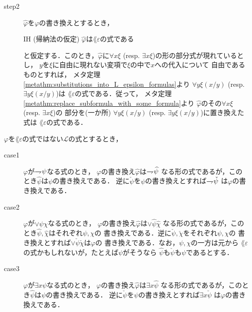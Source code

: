 \begin{metaprf}
\begin{description}
			\item[step2] $\widehat{\varphi}$を$\varphi$の書き換えとするとき，
				\begin{itembox}[l]{IH (帰納法の仮定)}
					$\widehat{\varphi}$は$\lang{\varepsilon}$の式である
				\end{itembox}
				と仮定する．このとき，$\widehat{\varphi}$に$\forall x \xi$ 
				(resp. $\exists x \xi$)の形の部分式が現れているとし，
				$y$を$\xi$に自由に現れない変項で$\xi$の中で$x$への代入について
				自由であるものとすれば，
				メタ定理\ref{metathm:substitutions_into_L_epsilon_formulas}より
				$\forall y \xi(x/y)$ (resp. $\exists y \xi(x/y)$)は
				$\lang{\varepsilon}$の式である．従って，
				メタ定理\ref{metathm:replace_subformula_with_some_formula}より
				$\widehat{\varphi}$のその$\forall x \xi$ (resp. $\exists x \xi$)の
				部分を(一か所)
				$\forall y \xi(x/y)$ (resp. $\exists y \xi(x/y)$)に置き換えた式は
				$\lang{\varepsilon}$の式である．
				\QED
		\end{description}
	\end{metaprf}
	
	\begin{screen}
		\begin{metathm}[部分式の書き換えとの関係]
		\label{metathm:relation_to_subformula_rewriting}
			$\varphi$を$\lang{\varepsilon}$の式ではない$\mathcal{L}$の式とするとき，
			\begin{description}
				\item[case1] $\varphi$が$\rightharpoondown\hspace{-0.25em} \psi$なる式のとき，
					$\varphi$の書き換え$\widehat{\varphi}$は$\rightharpoondown\hspace{-0.25em} \widehat{\psi}$
					なる形の式であるが，このとき$\widehat{\psi}$は$\psi$の書き換えである．
					逆に$\check{\psi}$を$\psi$の書き換えとすれば$\rightharpoondown\hspace{-0.25em} \check{\psi}$
					は$\varphi$の書き換えである．
					
				\item[case2] $\varphi$が$\vee \psi \chi$なる式のとき，
					$\varphi$の書き換え$\widehat{\varphi}$は$\vee \widehat{\psi} \widehat{\chi}$
					なる形の式であるが，このとき$\widehat{\psi},\widehat{\chi}$はそれぞれ$\psi,\chi$の
					書き換えである．逆に$\check{\psi},\check{\chi}$をそれぞれ$\psi,\chi$の
					書き換えとすれば$\vee \check{\psi} \check{\chi}$は$\varphi$の
					書き換えである．なお，$\psi,\chi$の一方は元から
					$\lang{\varepsilon}$の式かもしれないが，たとえば$\psi$がそうなら
					$\widehat{\psi}$も$\check{\psi}$も$\psi$であるとする．
					
				\item[case3] $\varphi$が$\exists x \psi$なる式のとき，
					$\varphi$の書き換え$\widehat{\varphi}$は$\exists x \widehat{\psi}$
					なる形の式であるが，このとき$\widehat{\psi}$は$\psi$の書き換えである．
					逆に$\check{\psi}$を$\psi$の書き換えとすれば$\exists x \check{\psi}$
					は$\varphi$の書き換えである．
			\end{description}
		\end{metathm}
	\end{screen}
	
